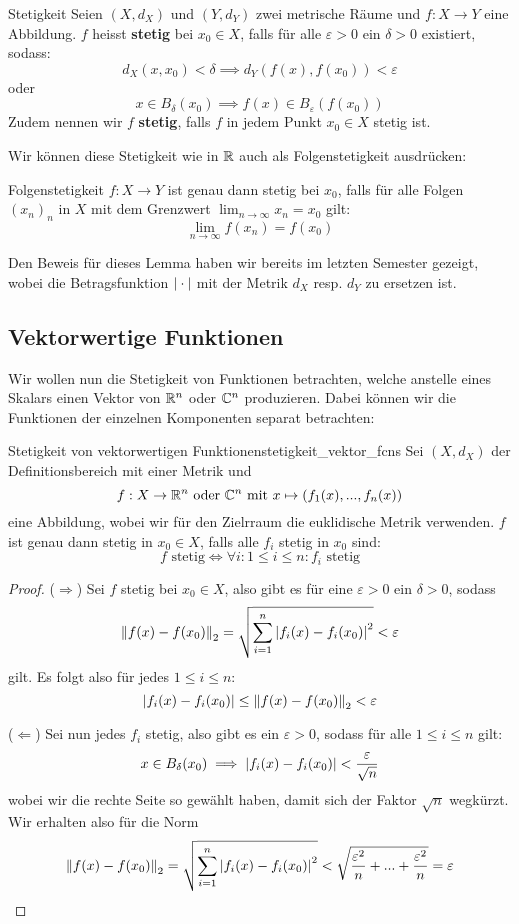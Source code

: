 \begin{definition}{Stetigkeit}{}
Seien $(X, d_X)$ und $(Y, d_Y)$ zwei metrische Räume und $f: X \to Y$ eine Abbildung. $f$ heisst \textbf{stetig} bei $x_0 \in X$, falls für alle $\varepsilon > 0$ ein $\delta > 0$ existiert, sodass:
$$d_X(x,x_0) < \delta \implies d_Y(f(x), f(x_0)) < \varepsilon$$
oder
$$x \in B_\delta(x_0) \implies f(x) \in B_\varepsilon(f(x_0))$$
Zudem nennen wir $f$ \textbf{stetig}, falls $f$ in jedem Punkt $x_0 \in X$ stetig ist.
\end{definition}

Wir können diese Stetigkeit wie in $\mathbb{R}$ auch als Folgenstetigkeit ausdrücken:

\begin{lemma}{Folgenstetigkeit}{}
$f: X \to Y$ ist genau dann stetig bei $x_0$, falls für alle Folgen $(x_n)_n$ in $X$ mit dem Grenzwert $\lim_{n \to \infty}x_n = x_0$ gilt:
$$\lim_{n \to \infty} f(x_n) = f(x_0)$$
\end{lemma}
Den Beweis für dieses Lemma haben wir bereits im letzten Semester gezeigt, wobei die Betragsfunktion $\left|\:\cdot\:\right|$ mit der Metrik $d_X$ resp. $d_Y$ zu ersetzen ist.

\subsection{Vektorwertige Funktionen}
Wir wollen nun die Stetigkeit von Funktionen betrachten, welche anstelle eines Skalars einen Vektor von $\mathbb{R}^n$ oder $\mathbb{C}^n$ produzieren. Dabei können wir die Funktionen der einzelnen Komponenten separat betrachten:

\begin{satz}{Stetigkeit von vektorwertigen Funktionen}{stetigkeit_vektor_fcns}
Sei $(X, d_X)$ der Definitionsbereich mit einer Metrik und
$$f: X \to \mathbb{R}^n \text{ oder } \mathbb{C}^n \text{ mit } x \mapsto (f_1(x), ..., f_n(x))$$
eine Abbildung, wobei wir für den Zielrraum die euklidische Metrik verwenden. $f$ ist genau dann stetig in $x_0 \in X$, falls alle $f_i$ stetig in $x_0$ sind:
$$f \text{ stetig} \iff \forall i: 1 \leq i \leq n: f_i \text{ stetig}$$
\end{satz}
\begin{proof} ($\Longrightarrow$) Sei $f$ stetig bei $x_0 \in X$, also gibt es für eine $\varepsilon > 0$ ein $\delta > 0$, sodass
$$\left\|f(x)-f(x_0)\right\|_2 = \sqrt{\sum_{i=1}^n \left|f_i(x) - f_i(x_0)\right|^2} < \varepsilon$$
gilt. Es folgt also für jedes $1 \leq i \leq n$:
$$\left|f_i(x) - f_i(x_0)\right| \leq \left\|f(x) - f(x_0)\right\|_2 < \varepsilon$$

($\Longleftarrow$) Sei nun jedes $f_i$ stetig, also gibt es ein $\varepsilon > 0$, sodass für alle $1 \leq i \leq n$ gilt:
$$x\in B_\delta(x_0) \implies \left|f_i(x) - f_i(x_0)\right| < \frac{\varepsilon}{\sqrt{n}}$$
wobei wir die rechte Seite so gewählt haben, damit sich der Faktor $\sqrt{n}$ wegkürzt. Wir erhalten  also für die Norm
$$\left\|f(x)-f(x_0)\right\|_2 = \sqrt{\sum_{i=1}^n \left|f_i(x) - f_i(x_0)\right|^2} < \sqrt{\frac{\varepsilon^2}{n} + ... + \frac{\varepsilon^2}{n}} = \varepsilon$$
\end{proof}

